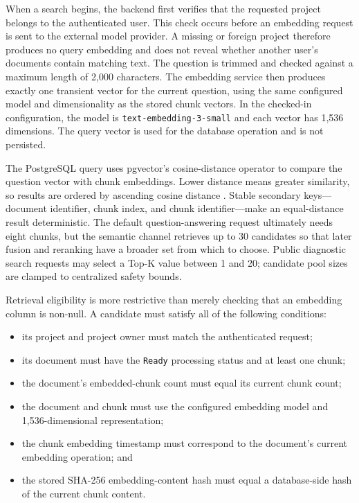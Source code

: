 When a search begins, the backend first verifies that the requested project belongs to the authenticated user. This check occurs before an embedding request is sent to the external model provider. A missing or foreign project therefore produces no query embedding and does not reveal whether another user's documents contain matching text. The question is trimmed and checked against a maximum length of 2,000 characters. The embedding service then produces exactly one transient vector for the current question, using the same configured model and dimensionality as the stored chunk vectors. In the checked-in configuration, the model is \texttt{text-embedding-3-small} and each vector has 1,536 dimensions. The query vector is used for the database operation and is not persisted.

The PostgreSQL query uses pgvector's cosine-distance operator to compare the question vector with chunk embeddings. Lower distance means greater similarity, so results are ordered by ascending cosine distance \cite{PgvectorDocs}. Stable secondary keys---document identifier, chunk index, and chunk identifier---make an equal-distance result deterministic. The default question-answering request ultimately needs eight chunks, but the semantic channel retrieves up to 30 candidates so that later fusion and reranking have a broader set from which to choose. Public diagnostic search requests may select a Top-K value between 1 and 20; candidate pool sizes are clamped to centralized safety bounds.

Retrieval eligibility is more restrictive than merely checking that an embedding column is non-null. A candidate must satisfy all of the following conditions:

\begin{itemize}
	\item its project and project owner must match the authenticated request;
	\item its document must have the \texttt{Ready} processing status and at least one chunk;
	\item the document's embedded-chunk count must equal its current chunk count;
	\item the document and chunk must use the configured embedding model and 1,536-dimensional representation;
	\item the chunk embedding timestamp must correspond to the document's current embedding operation; and
	\item the stored SHA-256 embedding-content hash must equal a database-side hash of the current chunk content.
\end{itemize}

